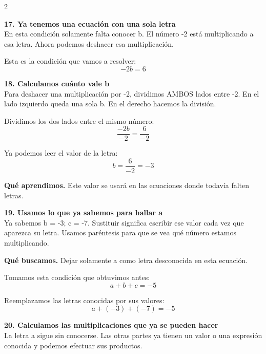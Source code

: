 \documentclass[11pt,a4paper,landscape]{article}
\begin{document}
\begin{multicols*}{2}
\noindent\begin{minipage}{\linewidth}\textbf{17. Ya tenemos una ecuación con una sola letra}\\[2pt]En esta condición solamente falta conocer b. El número -2 está multiplicando a esa letra. Ahora podemos deshacer esa multiplicación.
\par\smallskip Esta es la condición que vamos a resolver:
\[-2b = 6\]
\end{minipage}\par\medskip
\noindent\begin{minipage}{\linewidth}\textbf{18. Calculamos cuánto vale b}\\[2pt]Para deshacer una multiplicación por -2, dividimos AMBOS lados entre -2. En el lado izquierdo queda una sola b. En el derecho hacemos la división.
\par\smallskip Dividimos los dos lados entre el mismo número:
\[\frac{-2b}{-2}=\frac{6}{-2}\]
\par\smallskip Ya podemos leer el valor de la letra:
\[b=\frac{6}{-2}=-3\]
\par\smallskip\textbf{Qué aprendimos.} Este valor se usará en las ecuaciones donde todavía falten letras.
\end{minipage}\par\medskip
\noindent\begin{minipage}{\linewidth}\textbf{19. Usamos lo que ya sabemos para hallar a}\\[2pt]Ya sabemos b = -3; c = -7. Sustituir significa escribir ese valor cada vez que aparezca su letra. Usamos paréntesis para que se vea qué número estamos multiplicando.
\par\smallskip\textbf{Qué buscamos.} Dejar solamente a como letra desconocida en esta ecuación.
\par\smallskip Tomamos esta condición que obtuvimos antes:
\[a + b + c = -5\]
\par\smallskip Reemplazamos las letras conocidas por sus valores:
\[a + \left(-3\right) + \left(-7\right)=-5\]
\end{minipage}\par\medskip
\noindent\begin{minipage}{\linewidth}\textbf{20. Calculamos las multiplicaciones que ya se pueden hacer}\\[2pt]La letra a sigue sin conocerse. Las otras partes ya tienen un valor o una expresión conocida y podemos efectuar sus productos.
\par{}\par\smallskip

\end{minipage}
\end{multicols*}
\end{document}
